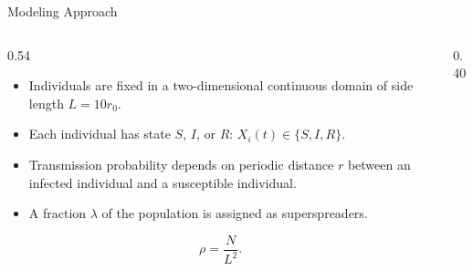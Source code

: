 \documentclass[aspectratio=169,10pt]{beamer}
\begin{document}
\begin{frame}{Modeling Approach}
  \begin{columns}[T,totalwidth=\linewidth]
    \begin{column}{0.54\linewidth}
      \begin{itemize}
        \item Individuals are fixed in a two-dimensional continuous domain of side length $L=10r_0$.
        \item Each individual has state $S$, $I$, or $R$: $X_i(t)\in\{S,I,R\}$.
        \item Transmission probability depends on periodic distance $r$ between an infected individual and a susceptible individual.
        \item A fraction $\lambda$ of the population is assigned as superspreaders.
      \end{itemize}
      \[
        \rho=\frac{N}{L^2}.
      \]
    \end{column}
    \begin{column}{0.40\linewidth}
      \centering
\end{column}
\end{columns}
\end{frame}
\end{document}
